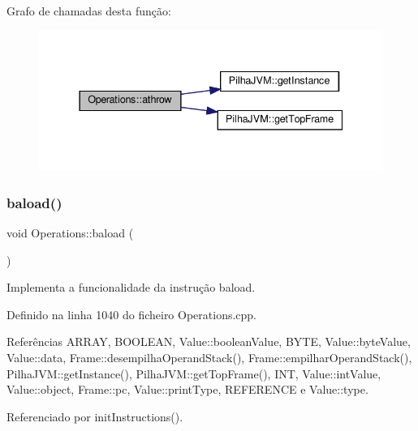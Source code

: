 Grafo de chamadas desta função\+:\nopagebreak
\begin{figure}[H]
\begin{center}
\leavevmode
\includegraphics[width=337pt]{classOperations_a2a5eea0fb18391bb3854dfe55c8ac5d3_cgraph}
\end{center}
\end{figure}
\mbox{\label{classOperations_afdf1759637e332569a2b2b17067e05f0}} 
\subsubsection{\texorpdfstring{baload()}{baload()}}
{\footnotesize\ttfamily void Operations\+::baload (\begin{DoxyParamCaption}{ }\end{DoxyParamCaption})\hspace{0.3cm}{\ttfamily [private]}}



Implementa a funcionalidade da instrução baload. 



Definido na linha 1040 do ficheiro Operations.\+cpp.



Referências A\+R\+R\+AY, B\+O\+O\+L\+E\+AN, Value\+::boolean\+Value, B\+Y\+TE, Value\+::byte\+Value, Value\+::data, Frame\+::desempilha\+Operand\+Stack(), Frame\+::empilhar\+Operand\+Stack(), Pilha\+J\+V\+M\+::get\+Instance(), Pilha\+J\+V\+M\+::get\+Top\+Frame(), I\+NT, Value\+::int\+Value, Value\+::object, Frame\+::pc, Value\+::print\+Type, R\+E\+F\+E\+R\+E\+N\+CE e Value\+::type.



Referenciado por init\+Instructions().

